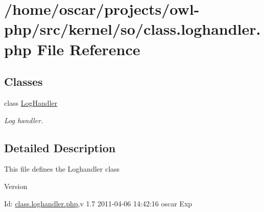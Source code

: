 \section{/home/oscar/projects/owl-\/php/src/kernel/so/class.loghandler.php File Reference}
\label{class_8loghandler_8php}
\subsection*{Classes}
\begin{DoxyCompactItemize}
\item 
class \hyperlink{classLogHandler}{LogHandler}
\begin{DoxyCompactList}\small\item\em Log handler. \item\end{DoxyCompactList}\end{DoxyCompactItemize}


\subsection{Detailed Description}
This file defines the Loghandler class \begin{DoxyVersion}{Version}

\end{DoxyVersion}
\begin{DoxyParagraph}{Id:}
\hyperlink{class_8loghandler_8php}{class.loghandler.php},v 1.7 2011-\/04-\/06 14:42:16 oscar Exp 
\end{DoxyParagraph}
